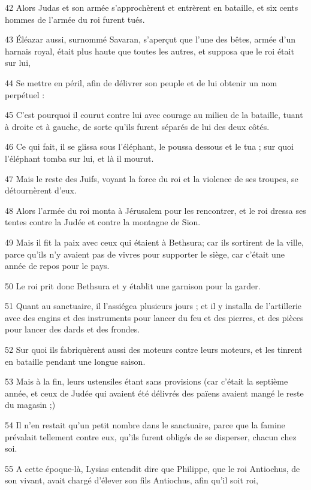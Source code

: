 \par 42 Alors Judas et son armée s'approchèrent et entrèrent en bataille, et six cents hommes de l'armée du roi furent tués.
\par 43 Éléazar aussi, surnommé Savaran, s'aperçut que l'une des bêtes, armée d'un harnais royal, était plus haute que toutes les autres, et supposa que le roi était sur lui,
\par 44 Se mettre en péril, afin de délivrer son peuple et de lui obtenir un nom perpétuel :
\par 45 C'est pourquoi il courut contre lui avec courage au milieu de la bataille, tuant à droite et à gauche, de sorte qu'ils furent séparés de lui des deux côtés.
\par 46 Ce qui fait, il se glissa sous l'éléphant, le poussa dessous et le tua ; sur quoi l'éléphant tomba sur lui, et là il mourut.
\par 47 Mais le reste des Juifs, voyant la force du roi et la violence de ses troupes, se détournèrent d'eux.
\par 48 Alors l'armée du roi monta à Jérusalem pour les rencontrer, et le roi dressa ses tentes contre la Judée et contre la montagne de Sion.
\par 49 Mais il fit la paix avec ceux qui étaient à Bethsura; car ils sortirent de la ville, parce qu'ils n'y avaient pas de vivres pour supporter le siège, car c'était une année de repos pour le pays.
\par 50 Le roi prit donc Bethsura et y établit une garnison pour la garder.
\par 51 Quant au sanctuaire, il l'assiégea plusieurs jours ; et il y installa de l'artillerie avec des engins et des instruments pour lancer du feu et des pierres, et des pièces pour lancer des dards et des frondes.
\par 52 Sur quoi ils fabriquèrent aussi des moteurs contre leurs moteurs, et les tinrent en bataille pendant une longue saison.
\par 53 Mais à la fin, leurs ustensiles étant sans provisions (car c'était la septième année, et ceux de Judée qui avaient été délivrés des païens avaient mangé le reste du magasin ;)
\par 54 Il n'en restait qu'un petit nombre dans le sanctuaire, parce que la famine prévalait tellement contre eux, qu'ils furent obligés de se disperser, chacun chez soi.
\par 55 A cette époque-là, Lysias entendit dire que Philippe, que le roi Antiochus, de son vivant, avait chargé d'élever son fils Antiochus, afin qu'il soit roi,
